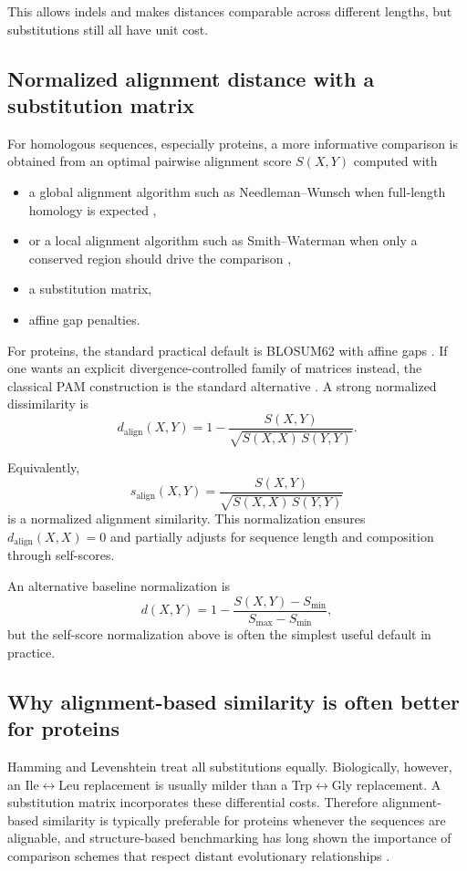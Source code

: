 \documentclass[11pt,a4paper]{article}
\begin{document}
This allows indels and makes distances comparable across different lengths, but substitutions still all have unit cost.

\subsection{Normalized alignment distance with a substitution matrix}

For homologous sequences, especially proteins, a more informative comparison is obtained from an optimal pairwise alignment score $S(X,Y)$ computed with

\begin{itemize}[leftmargin=*]
\item a global alignment algorithm such as Needleman--Wunsch when full-length homology is expected \cite{Needleman1970},
\item or a local alignment algorithm such as Smith--Waterman when only a conserved region should drive the comparison \cite{Smith1981},
\item a substitution matrix,
\item affine gap penalties.
\end{itemize}

For proteins, the standard practical default is BLOSUM62 with affine gaps \cite{Henikoff1992}. If one wants an explicit divergence-controlled family of matrices instead, the classical PAM construction is the standard alternative \cite{Dayhoff1978}. A strong normalized dissimilarity is
\[
d_{\mathrm{align}}(X,Y)=1-\frac{S(X,Y)}{\sqrt{S(X,X)\,S(Y,Y)}}.
\]

Equivalently,
\[
s_{\mathrm{align}}(X,Y)=\frac{S(X,Y)}{\sqrt{S(X,X)\,S(Y,Y)}}
\]
is a normalized alignment similarity. This normalization ensures $d_{\mathrm{align}}(X,X)=0$ and partially adjusts for sequence length and composition through self-scores.

An alternative baseline normalization is
\[
d(X,Y)=1-\frac{S(X,Y)-S_{\min}}{S_{\max}-S_{\min}},
\]
but the self-score normalization above is often the simplest useful default in practice.

\subsection{Why alignment-based similarity is often better for proteins}

Hamming and Levenshtein treat all substitutions equally. Biologically, however, an Ile$\leftrightarrow$Leu replacement is usually milder than a Trp$\leftrightarrow$Gly replacement. A substitution matrix incorporates these differential costs. Therefore alignment-based similarity is typically preferable for proteins whenever the sequences are alignable, and structure-based benchmarking has long shown the importance of comparison schemes that respect distant evolutionary relationships \cite{Brenner1998}.
\end{document}
